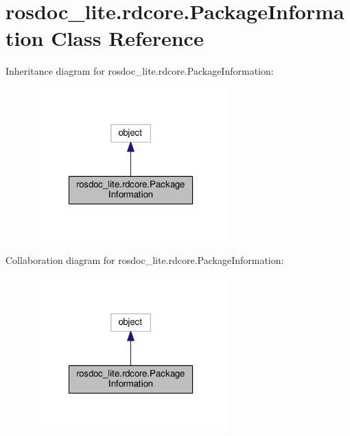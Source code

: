 \hypertarget{classrosdoc__lite_1_1rdcore_1_1PackageInformation}{\section{rosdoc\-\_\-lite.\-rdcore.\-Package\-Information Class Reference}
\label{classrosdoc__lite_1_1rdcore_1_1PackageInformation}
}


Inheritance diagram for rosdoc\-\_\-lite.\-rdcore.\-Package\-Information\-:
\nopagebreak
\begin{figure}[H]
\begin{center}
\leavevmode
\includegraphics[width=214pt]{classrosdoc__lite_1_1rdcore_1_1PackageInformation__inherit__graph}
\end{center}
\end{figure}


Collaboration diagram for rosdoc\-\_\-lite.\-rdcore.\-Package\-Information\-:
\nopagebreak
\begin{figure}[H]
\begin{center}
\leavevmode
\includegraphics[width=214pt]{classrosdoc__lite_1_1rdcore_1_1PackageInformation__coll__graph}
\end{center}
\end{figure}
